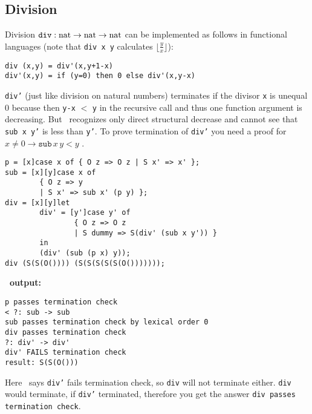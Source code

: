 \subsection{Division\label{ex:div}}
Division
$\mathtt{div} : \mathrm{nat} \rightarrow \mathrm{nat} \rightarrow \mathrm{nat}$
can be implemented as follows in functional languages (note
that {\tt div x y} calculates $\lfloor \frac{y}{x} \rfloor$):
\begin{verbatim}
div (x,y) = div'(x,y+1-x)
div'(x,y) = if (y=0) then 0 else div'(x,y-x)
\end{verbatim}
{\tt div'} (just like division on natural numbers) terminates if the
divisor {\tt x} is unequal 0 because then {\tt y-x} $<$ {\tt y} in the
recursive call and thus one function argument is decreasing. But
\foetus\ recognizes only direct structural decrease and cannot see
that {\tt sub x y'} is less than {\tt y'}. To prove termination of
{\tt div'} you need a proof for $x \not= 0 \rightarrow \mathtt{sub}\, x \,y
< y$ \cite{BG96}.
\begin{verbatim}
p = [x]case x of { O z => O z | S x' => x' };
sub = [x][y]case x of
        { O z => y
        | S x' => sub x' (p y) };
div = [x][y]let
        div' = [y']case y' of
                { O z => O z
                | S dummy => S(div' (sub x y')) }
        in
        (div' (sub (p x) y));
div (S(S(O()))) (S(S(S(S(S(O()))))));
\end{verbatim}
{\bf\foetus\ output:}\nopagebreak
\begin{verbatim}
p passes termination check
< ?: sub -> sub
sub passes termination check by lexical order 0
div passes termination check
?: div' -> div'
div' FAILS termination check
result: S(S(O()))
\end{verbatim}
Here \foetus\ says {\tt div'} fails termination check, so {\tt div}
will not terminate either. {\tt div} would terminate, if {\tt div'}
terminated, therefore you get the answer {\tt div passes termination check}.

